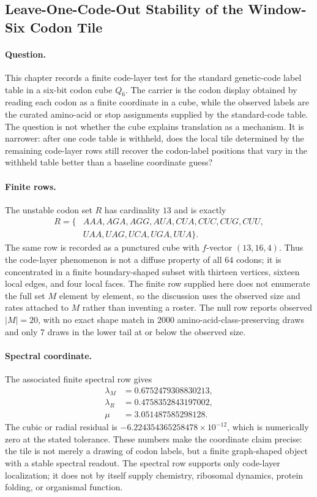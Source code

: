 \subsection{Leave-One-Code-Out Stability of the Window-Six Codon Tile}\label{sec:h1-leave-one-code-out}

\paragraph{Question.} This chapter records a finite code-layer test for the standard genetic-code label table in a six-bit codon cube $Q_6$. The carrier is the codon display obtained by reading each codon as a finite coordinate in a cube, while the observed labels are the curated amino-acid or stop assignments supplied by the standard-code table. The question is not whether the cube explains translation as a mechanism. It is narrower: after one code table is withheld, does the local tile determined by the remaining code-layer rows still recover the codon-label positions that vary in the withheld table better than a baseline coordinate guess?

\paragraph{Finite rows.} The unstable codon set $R$ has cardinality $13$ and is exactly
$$
\begin{aligned}
R=\{&AAA, AGA, AGG, AUA, CUA, CUC, CUG, CUU,\\
&UAA, UAG, UCA, UGA, UUA\}.
\end{aligned}
$$
The same row is recorded as a punctured cube with $f$-vector $(13,16,4)$. Thus the code-layer phenomenon is not a diffuse property of all $64$ codons; it is concentrated in a finite boundary-shaped subset with thirteen vertices, sixteen local edges, and four local faces. The finite row supplied here does not enumerate the full set $M$ element by element, so the discussion uses the observed size and rates attached to $M$ rather than inventing a roster. The null row reports observed $|M|=20$, with no exact shape match in $2000$ amino-acid-class-preserving draws and only $7$ draws in the lower tail at or below the observed size.

\paragraph{Spectral coordinate.} The associated finite spectral row gives
$$
\begin{aligned}
\lambda_M&=0.6752479308830213,\\
\lambda_R&=0.4758352843197002,\\
\mu&=3.051487585298128.
\end{aligned}
$$
The cubic or radial residual is $-6.224354365258478\times 10^{-12}$, which is numerically zero at the stated tolerance. These numbers make the coordinate claim precise: the tile is not merely a drawing of codon labels, but a finite graph-shaped object with a stable spectral readout. The spectral row supports only code-layer localization; it does not by itself supply chemistry, ribosomal dynamics, protein folding, or organismal function.


